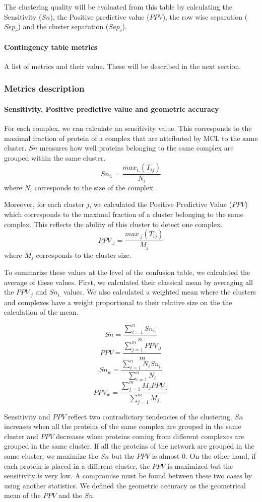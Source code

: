 The clustering quality will be evaluated from this table by calculating the Sensitivity ($Sn$), the Positive predictive
value ($PPV$), the row wise separation ($Sep_{r}$) and the cluster separation ($Sep_{c}$).

\paragraph{Contingency table metrics}
  A list of metrics and their value. These will be described in the next section.

\subsubsection{Metrics description}
\paragraph{Sensitivity, Positive predictive value and geometric accuracy}

For each complex, we can calculate an sensitivity value. This corresponds to the maximal fraction of protein of a complex that are attributed by MCL to the same cluster. $Sn$ measures how well proteins belonging to the same complex are grouped within the same cluster.
\[Sn_{i.}=\frac{max_{i.}(T_{ij})}{N_i}\]
where $N_i$ corresponds to the size of the complex.

Moreover, for each cluster $j$, we calculated the Positive Predictive Value ($PPV$) which corresponds to the maximal fraction of a cluster belonging to the same complex. This reflects the ability of this cluster to detect one complex.
\[PPV_{.j}=\frac{max_{.j}(T_{ij})}{M_j}\]
where $M_j$ corresponds to the cluster size.

To summarize these values at the level of the confusion table, we calculated the average of these values. 
First, we calculated their classical mean by averaging all the $PPV_{.j}$ and $Sn_{i.}$ values. We also calculated a weighted mean where the clusters and complexes have a weight proportional to their relative size on the the calculation of the mean.

\[Sn = \frac{\sum_{i=1}^nSn_{i.}}{n}\]
\[PPV = \frac{\sum_{j=1}^mPPV_{.j}}{m}\]
\[Sn_w = \frac{\sum_{i=1}^nN_iSn_{i.}}{\sum_{i=1}^nN_i}\]
\[PPV_w = \frac{\sum_{j=1}^mM_jPPV_{.j}}{\sum_{j=1}^mM_j}\]

Sensitivity and $PPV$ reflect two contradictory tendencies of the clustering. $Sn$ increases when all the proteins of the same complex are grouped in the same cluster and $PPV$ decreases when proteins coming from different complexes are grouped in the same cluster. If all the proteins of the network are grouped in the same cluster, we maximize the $Sn$ but the $PPV$ is almost 0. On the other hand, if each protein is placed in a different cluster, the $PPV$ is maximized  but the sensitivity is very low. A compromise must be found between these two cases by using another statistics. We defined the geometric accuracy as the geometrical mean of the $PPV$ and the $Sn$.

